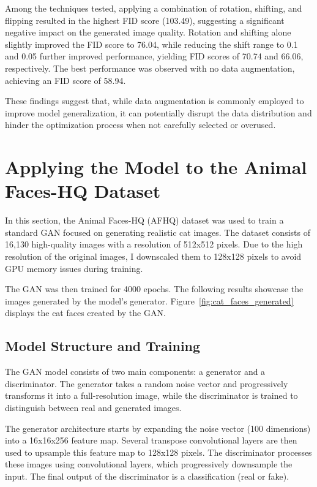 Among the techniques tested, applying a combination of rotation, shifting, and flipping resulted in the highest FID score (103.49), suggesting a significant negative impact on the generated image quality. Rotation and shifting alone slightly improved the FID score to 76.04, while reducing the shift range to 0.1 and 0.05 further improved performance, yielding FID scores of 70.74 and 66.06, respectively. The best performance was observed with no data augmentation, achieving an FID score of 58.94.

These findings suggest that, while data augmentation is commonly employed to improve model generalization, it can potentially disrupt the data distribution and hinder the optimization process when not carefully selected or overused.

\section{Applying the Model to the Animal Faces-HQ Dataset}

In this section, the Animal Faces-HQ (AFHQ) dataset was used to train a standard GAN focused on generating realistic cat images. The dataset consists of 16,130 high-quality images with a resolution of 512x512 pixels. Due to the high resolution of the original images, I downscaled them to 128x128 pixels to avoid GPU memory issues during training.

The GAN was then trained for 4000 epochs. The following results showcase the images generated by the model's generator. Figure~\ref{fig:cat_faces_generated} displays the cat faces created by the GAN.

\subsection{Model Structure and Training}

The GAN model consists of two main components: a generator and a discriminator. The generator takes a random noise vector and progressively transforms it into a full-resolution image, while the discriminator is trained to distinguish between real and generated images.

The generator architecture starts by expanding the noise vector (100 dimensions) into a 16x16x256 feature map. Several transpose convolutional layers are then used to upsample this feature map to 128x128 pixels. The discriminator processes these images using convolutional layers, which progressively downsample the input. The final output of the discriminator is a classification (real or fake).

